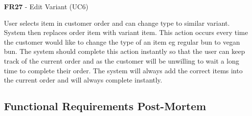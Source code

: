 \noindent \textbf{FR27} - Edit Variant (UC6)\\
\begin{small}
	User selects item in customer order and can change type to similar variant. System then replaces order item with variant item. This action occurs every time the customer would like to change the type of an item eg regular bun to vegan bun. The system should complete this action instantly so that the user can keep track of the current order and as the customer will be unwilling to wait a long time to complete their order. The system will always add the correct items into the current order and will always complete instantly.\\
\end{small}
\linebreak

\subsection{Functional Requirements Post-Mortem}